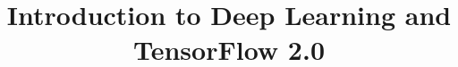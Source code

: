 \documentclass[xcolor=dvipsnames,compress,t,pdf,9pt]{beamer}
\title[\insertframenumber /\inserttotalframenumber]{Introduction to Deep Learning and TensorFlow 2.0}
\begin{document}
	\begin{frame}
	\titlepage
	\end{frame}

	
	
\end{document}
